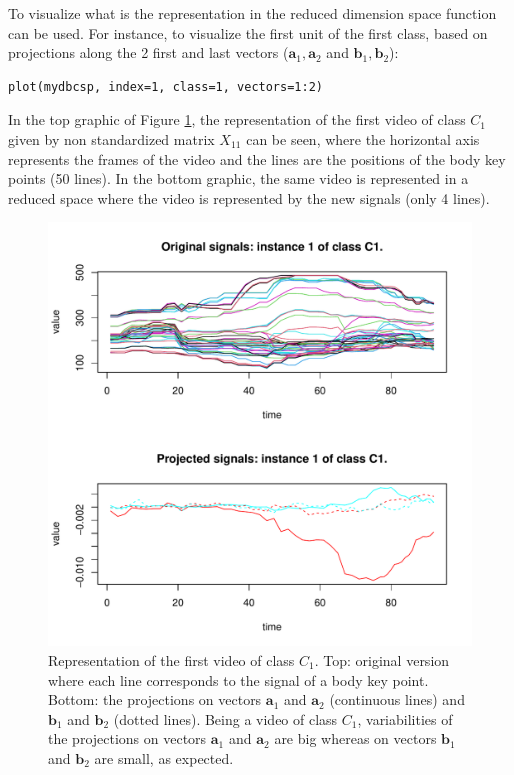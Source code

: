To visualize what is the representation in the reduced dimension space function  can be used. For instance, to visualize the first unit of the first class, based on projections along the 2 first and last vectors ($\mathbf{a}_1,  \mathbf{a}_2$ and $\mathbf{b}_1, \mathbf{b}_2$):

\begin{verbatim}
plot(mydbcsp, index=1, class=1, vectors=1:2)
\end{verbatim}
In the top  graphic of Figure \ref{fig:plot1},  the representation of the first video of class $C_1$ given by non standardized matrix  $X_{11}$ can be seen, where the horizontal axis represents the frames of the video and the lines are the positions of the body key points (50 lines). In the bottom graphic, the same video is represented in a reduced space where the video is represented by the new signals (only 4 lines).

\begin{figure}
    \centering
    \includegraphics[width=\textwidth]{plot1.pdf}
    \caption{Representation of the first video of class $C_1$. Top: original version where each line corresponds to the signal of a body key point. Bottom: the projections on vectors $\mathbf{a}_1$ and $\mathbf{a}_2$ (continuous lines) and $\mathbf{b}_1$ and $\mathbf{b}_2$ (dotted lines). Being a video of class $C_1$, variabilities of the projections on vectors $\mathbf{a}_1$ and $\mathbf{a}_2$ are big whereas on vectors $\mathbf{b}_1$ and $\mathbf{b}_2$ are small, as expected.}
    \label{fig:plot1}
\end{figure}

